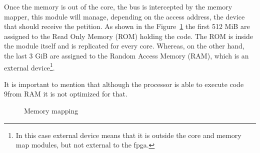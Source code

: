 Once the memory is out of the core, the bus is intercepted by the memory mapper,
this module will manage, depending on the access address, the device that
should receive the petition. As shown in the Figure~\ref{fig:memory_map} the
first 512 MiB are assigned to the Read Only Memory (ROM) holding the code. The ROM is inside the module itself
and is replicated for every core. Whereas, on the other hand, the last 3 GiB
are assigned to the Random Access Memory (RAM), which is an external device\footnote{In this case external 
device means that it is outside the core and memory map modules, but not external
to the \gls{fpga}.}.

It is important to mention that although the processor is able to execute code
9from RAM it is not optimized for that.


\begin{figure}
  \centering

  \caption{Memory mapping}
  \label{fig:memory_map}

\end{figure}


